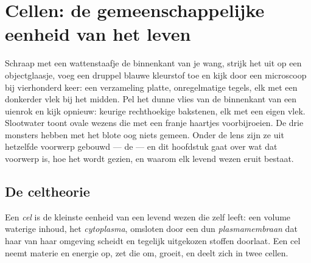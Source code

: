 \chapter{Cellen: de gemeenschappelijke eenheid van het leven}\label{ch:g10:cells-common-unit}

Schraap met een wattenstaafje de binnenkant van je wang, strijk het uit
op een objectglaasje, voeg een druppel blauwe kleurstof toe en kijk door
een microscoop bij vierhonderd keer: een verzameling platte,
onregelmatige tegels, elk met een donkerder vlek bij het midden. Pel het
dunne vlies van de binnenkant van een uienrok en kijk opnieuw: keurige
rechthoekige bakstenen, elk met een eigen vlek. Slootwater toont ovale
wezens die met een franje haartjes voorbijroeien. De drie monsters
hebben met het blote oog niets gemeen. Onder de lens zijn ze uit
hetzelfde voorwerp gebouwd --- de  --- en dit hoofdstuk gaat over wat
dat voorwerp is, hoe het wordt gezien, en waarom elk levend wezen eruit
bestaat.

\section{De celtheorie}

\begin{definition}[Cel]\label{def:g10:cells-common-unit:cell}
Een \emph{cel} is de kleinste eenheid van een levend wezen
die zelf leeft: een volume waterige inhoud, het
\emph{cytoplasma}, omsloten door een dun
\emph{plasmamembraan} dat haar van haar omgeving
scheidt en tegelijk uitgekozen stoffen doorlaat. Een cel neemt materie
en energie op, zet die om, groeit, en deelt zich in twee cellen.
\end{definition}


